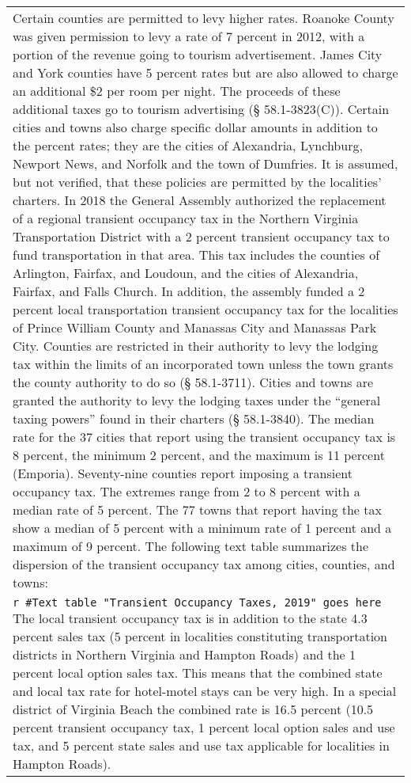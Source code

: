 \documentclass[
]{book}
\begin{document}
\begin{longtable}[]{@{}
  >{\raggedright\arraybackslash}p{}@{}}
\textbar{}
\textbar{} Certain counties are permitted to levy higher rates. Roanoke County was given permission to levy a rate of 7 percent in 2012, with a portion of the revenue going to tourism advertisement. James City and York counties have 5 percent rates but are also allowed to charge an additional \$2 per room per night. The proceeds of these additional taxes go to tourism advertising (§ 58.1-3823(C)). Certain cities and towns also charge specific dollar amounts in addition to the percent rates; they are the cities of Alexandria, Lynchburg, Newport News, and Norfolk and the town of Dumfries. It is assumed, but not verified, that these policies are permitted by the localities' charters.
\textbar{}
\textbar{} In 2018 the General Assembly authorized the replacement of a regional transient occupancy tax in the Northern Virginia Transportation District with a 2 percent transient occupancy tax to fund transportation in that area. This tax includes the counties of Arlington, Fairfax, and Loudoun, and the cities of Alexandria, Fairfax, and Falls Church. In addition, the assembly funded a 2 percent local transportation transient occupancy tax for the localities of Prince William County and Manassas City and Manassas Park City.
\textbar{}
\textbar{} Counties are restricted in their authority to levy the lodging tax within the limits of an incorporated town unless the town grants the county authority to do so (§ 58.1-3711). Cities and towns are granted the authority to levy the lodging taxes under the ``general taxing powers'' found in their charters (§ 58.1-3840).
\textbar{}
\textbar{} The median rate for the 37 cities that report using the transient occupancy tax is 8 percent, the minimum 2 percent, and the maximum is 11 percent (Emporia). Seventy-nine counties report imposing a transient occupancy tax. The extremes range from 2 to 8 percent with a median rate of 5 percent. The 77 towns that report having the tax show a median of 5 percent with a minimum rate of 1 percent and a maximum of 9 percent. The following text table summarizes the dispersion of the transient occupancy tax among cities, counties, and towns: \\
\texttt{r\ \#Text\ table\ "Transient\ Occupancy\ Taxes,\ 2019"\ goes\ here}
\textbar{}
\textbar{} The local transient occupancy tax is in addition to the state 4.3 percent sales tax (5 percent in localities constituting transportation districts in Northern Virginia and Hampton Roads) and the 1 percent local option sales tax. This means that the combined state and local tax rate for hotel-motel stays can be very high. In a special district of Virginia Beach the combined rate is 16.5 percent (10.5 percent transient occupancy tax, 1 percent local option sales and use tax, and 5 percent state sales and use tax applicable for localities in Hampton Roads).

\end{longtable}
\end{document}
